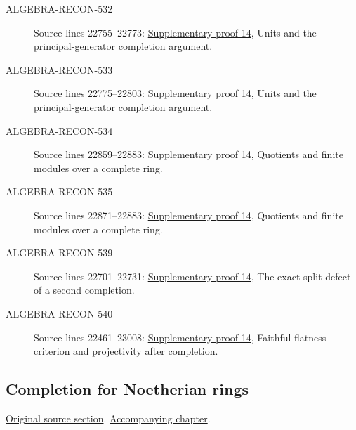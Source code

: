 \begin{description}
\item[ALGEBRA-RECON-532] Source lines 22755--22773: \hyperlink{algebra_projectivity_completion_notes_20260927}{Supplementary proof 14}, Units and the principal-generator completion argument.
\item[ALGEBRA-RECON-533] Source lines 22775--22803: \hyperlink{algebra_projectivity_completion_notes_20260927}{Supplementary proof 14}, Units and the principal-generator completion argument.
\item[ALGEBRA-RECON-534] Source lines 22859--22883: \hyperlink{algebra_projectivity_completion_notes_20260927}{Supplementary proof 14}, Quotients and finite modules over a complete ring.
\item[ALGEBRA-RECON-535] Source lines 22871--22883: \hyperlink{algebra_projectivity_completion_notes_20260927}{Supplementary proof 14}, Quotients and finite modules over a complete ring.
\item[ALGEBRA-RECON-539] Source lines 22701--22731: \hyperlink{algebra_projectivity_completion_notes_20260927}{Supplementary proof 14}, The exact split defect of a second completion.
\item[ALGEBRA-RECON-540] Source lines 22461--23008: \hyperlink{algebra_projectivity_completion_notes_20260927}{Supplementary proof 14}, Faithful flatness criterion and projectivity after completion.
\end{description}

\subsection{Completion for Noetherian rings}
\hypertarget{algebra-source-section-completion-noetherian}{}
\noindent\href{https://github.com/stacks/stacks-project/blob/a04446e57ec1fbc252a871afcec7752fb2807b14/algebra.tex\#L22893}{Original source section}. \href{algebra.pdf\#nameddest=section-completion-noetherian}{Accompanying chapter}.

